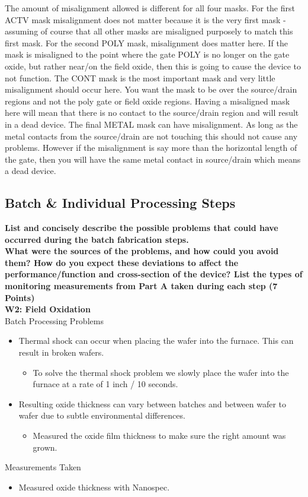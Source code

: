 \documentclass{article}
\begin{document}
The amount of misalignment allowed is different for all four masks. For the first ACTV mask misalignment does not matter because it is the very first mask - assuming of course that all other masks are misaligned purposely to match this first mask. For the second POLY mask, misalignment does matter here. If the mask is misaligned to the point where the gate POLY is no longer on the gate oxide, but rather near/on the field oxide, then this is going to cause the device to not function. The CONT mask is the most important mask and very little misalignment should occur here. You want the mask to be over the source/drain regions and not the poly gate or field oxide regions. Having a misaligned mask here will mean that there is no contact to the source/drain region and will result in a dead device. The final METAL mask can have misalignment. As long as the metal contacts from the source/drain are not touching this should not cause any problems. However if the misalignment is say more than the horizontal length of the gate, then you will have the same metal contact in source/drain which means a dead device.

\subsection{Batch \& Individual Processing Steps}

\textbf{List and concisely describe the possible problems that could have occurred during
the batch fabrication steps.} \\
\textbf{What were the sources of the problems, and how could you avoid them? How do
you expect these deviations to affect the performance/function and cross-section of
the device? List the types of monitoring measurements from Part A taken during
each step (7 Points)} \\

\textbf{W2: Field Oxidation}\\
Batch Processing Problems
\begin{itemize}
\item Thermal shock can occur when placing the wafer into the furnace. This can result in broken wafers.
	\begin{itemize}
	\item To solve the thermal shock problem we slowly place the wafer into the furnace at a rate of 1 inch / 10 seconds.
	\end{itemize}
\item Resulting oxide thickness can vary between batches and between wafer to wafer due to subtle environmental differences.
	\begin{itemize}
	\item Measured the oxide film thickness to make sure the right amount was grown.
	\end{itemize}
\end{itemize}
Measurements Taken
\begin{itemize}
\item Measured oxide thickness with Nanospec. 
\end{itemize}
\end{document}
